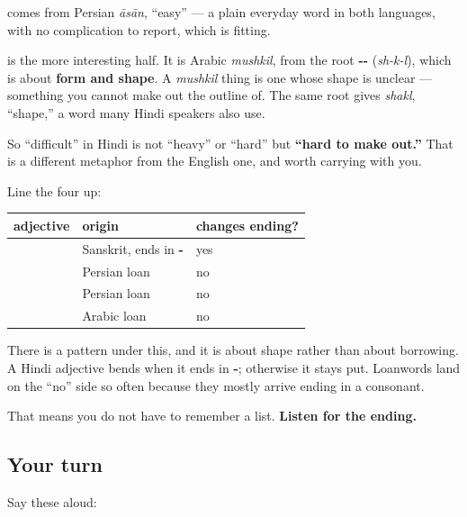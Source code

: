 \begin{cousinweb}
\textbf{} comes from Persian \emph{āsān}, \textquotedblleft{}easy\textquotedblright{} — a plain everyday word in both languages, with no complication to report, which is fitting.

\textbf{} is the more interesting half. It is Arabic \emph{mushkil}, from the root \textbf{--} (\emph{sh-k-l}), which is about \textbf{form and shape}. A \emph{mushkil} thing is one whose shape is unclear — something you cannot make out the outline of. The same root gives \emph{shakl}, \textquotedblleft{}shape,\textquotedblright{} a word many Hindi speakers also use.

So \textquotedblleft{}difficult\textquotedblright{} in Hindi is not \textquotedblleft{}heavy\textquotedblright{} or \textquotedblleft{}hard\textquotedblright{} but \textbf{\textquotedblleft{}hard to make out.\textquotedblright{}} That is a different metaphor from the English one, and worth carrying with you.
\end{cousinweb}

\begin{grammarlens}[title={Grammar Lens: which adjectives bend, and why}]
Line the four up:

\noindent
\begin{tabularx}{\linewidth}{@{}>{\raggedright\arraybackslash}X>{\raggedright\arraybackslash}X>{\raggedright\arraybackslash}X@{}}
\toprule
\textbf{adjective} & \textbf{origin} & \textbf{changes ending?} \\
\midrule
\hi{काला} & Sanskrit, ends in \textbf{-\hi{आ}} & yes \\
\hi{सफ़ेद} & Persian loan & no \\
\hi{आसान} & Persian loan & no \\
\hi{मुश्किल} & Arabic loan & no \\
\bottomrule
\end{tabularx}

There is a pattern under this, and it is about shape rather than about borrowing. A Hindi adjective bends when it ends in \textbf{-}; otherwise it stays put. Loanwords land on the \textquotedblleft{}no\textquotedblright{} side so often because they mostly arrive ending in a consonant.

That means you do not have to remember a list. \textbf{Listen for the ending.}
\end{grammarlens}

\subsection*{Your turn}
Say these aloud:

